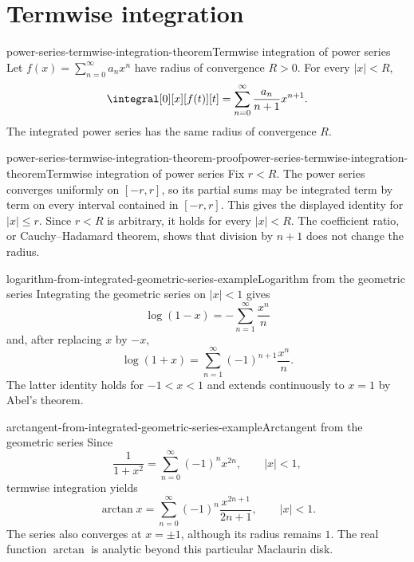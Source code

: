 \documentclass[preview]{standalone}
\begin{document}
\section{Termwise integration}

\begin{snippettheorem}{power-series-termwise-integration-theorem}{Termwise integration of power series}
    Let \(f(x)=\sum_{n=0}^{\infty}a_nx^n\) have radius of convergence
    \(R>0\). For every \(|x|<R\),
    \[
        \integral[0][x][f(t)][t]
        =\sum_{n=0}^{\infty}\frac{a_n}{n+1}x^{n+1}.
    \]
    The integrated power series has the same radius of convergence \(R\).
\end{snippettheorem}

\begin{snippetproof}{power-series-termwise-integration-theorem-proof}{power-series-termwise-integration-theorem}{Termwise integration of power series}
    Fix \(r<R\). The power series converges uniformly on \([-r,r]\), so its
    partial sums may be integrated term by term on every interval contained in
    \([-r,r]\). This gives the displayed identity for \(|x|\leq r\). Since
    \(r<R\) is arbitrary, it holds for every \(|x|<R\). The coefficient
    ratio, or Cauchy--Hadamard theorem, shows that division by \(n+1\) does not
    change the radius.
\end{snippetproof}

\begin{snippetexample}{logarithm-from-integrated-geometric-series-example}{Logarithm from the geometric series}
    Integrating the geometric series on \(|x|<1\) gives
    \[
        \log(1-x)=-\sum_{n=1}^{\infty}\frac{x^n}{n}
    \]
    and, after replacing \(x\) by \(-x\),
    \[
        \log(1+x)=\sum_{n=1}^{\infty}(-1)^{n+1}\frac{x^n}{n}.
    \]
    The latter identity holds for \(-1<x<1\) and extends continuously to
    \(x=1\) by Abel's theorem.
\end{snippetexample}

\begin{snippetexample}{arctangent-from-integrated-geometric-series-example}{Arctangent from the geometric series}
    Since
    \[
        \frac1{1+x^2}=\sum_{n=0}^{\infty}(-1)^nx^{2n},
        \qquad |x|<1,
    \]
    termwise integration yields
    \[
        \arctan x=\sum_{n=0}^{\infty}(-1)^n
        \frac{x^{2n+1}}{2n+1},
        \qquad |x|<1.
    \]
    The series also converges at \(x=\pm1\), although its radius remains
    \(1\). The real function \(\arctan\) is analytic beyond this particular
    Maclaurin disk.
\end{snippetexample}
\end{document}
